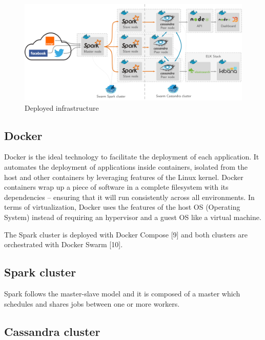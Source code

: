 \documentclass[11pt]{article}
\begin{document}
\begin{figure}[h!]
    \centering
    \includegraphics[scale=0.15]{img/archi.png}
    \caption{Deployed infrastructure}
    \label{infra}
\end{figure}

\subsection{Docker}

\textsf{Docker} is the ideal technology to facilitate the deployment of each application. It automates the deployment of applications inside containers, isolated from the host and other containers by leveraging features of the \textsf{Linux} kernel. \textsf{Docker} containers wrap up a piece of software in a complete filesystem with its dependencies – ensuring that it will run consistently across all environments. In terms of virtualization, \textsf{Docker} uses the features of the host OS (Operating System) instead of requiring an hypervisor and a guest OS like a virtual machine.


The \textsf{Spark} cluster is deployed with \textsf{Docker Compose} [9] and both clusters are orchestrated with \textsf{Docker Swarm} [10].

\subsection{Spark cluster}

\textsf{Spark} follows the master-slave model and it is composed of a master which schedules and shares jobs between one or more workers.

\subsection{Cassandra cluster}
\end{document}
